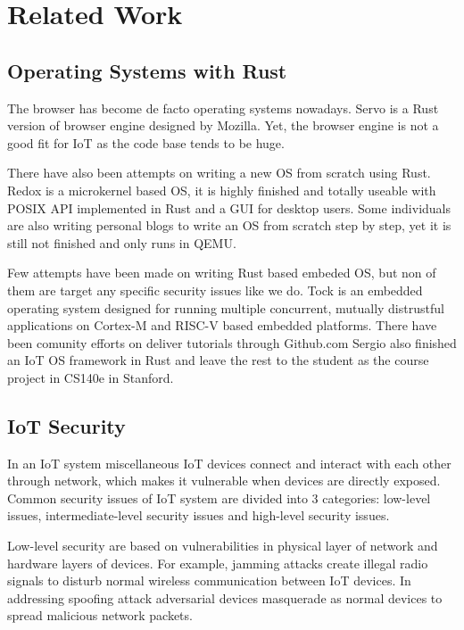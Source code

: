 \section{Related Work}

\subsection{Operating Systems with Rust}

The browser has become de facto operating systems nowadays.
Servo\cite{Servo} is a Rust version of browser engine designed by Mozilla.
Yet, the browser engine is not a good fit for IoT as the code base tends to be huge.

There have also been attempts on writing a new OS from scratch using Rust.
Redox\cite{Redox} is a microkernel based OS, it is highly finished and totally useable with POSIX API implemented in Rust and a GUI for desktop users.
Some individuals are also writing personal blogs\cite{OsPhil} to write an OS from scratch step by step, yet it is still not finished and only runs in QEMU. 

Few attempts have been made on writing Rust based embeded OS, but non of them are target any specific security issues like we do.
Tock\cite{levy2015ownership, levy2017tock, levy2017multiprogramming} is an embedded operating system designed for running multiple concurrent, mutually distrustful applications on Cortex-M and RISC-V based embedded platforms.
There have been comunity efforts on deliver tutorials through Github.com\cite{rpi-os-t0, rpi-os-t1}
Sergio also finished an IoT OS framework in Rust\cite{cs140e} and leave the rest to the student as the course project in CS140e in Stanford.

\subsection{IoT Security}

In an IoT system miscellaneous IoT devices connect and interact with each other through network, which makes it vulnerable when devices are directly exposed. Common security issues of IoT system are divided into 3 categories: low-level issues, intermediate-level security issues and high-level security issues.

Low-level security are based on vulnerabilities in physical layer of network and hardware layers of devices. For example, jamming attacks create illegal radio signals to disturb normal wireless communication between IoT devices\cite{xu2005feasibility,noubir2003low}. In addressing spoofing attack adversarial devices masquerade as normal devices to spread malicious network packets\cite{chen2007detecting}.

